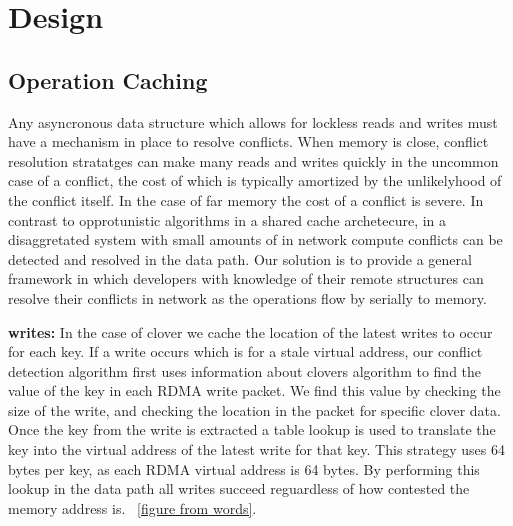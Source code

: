 \section{Design}


\subsection{Operation Caching}

Any asyncronous data structure which allows for lockless reads and writes must
have a mechanism in place to resolve conflicts. When memory is close, conflict
resolution stratatges can make many reads and writes quickly in the uncommon
case of a conflict, the cost of which is typically amortized by the unlikelyhood
of the conflict itself. In the case of far memory the cost of a conflict is
severe. In contrast to opprotunistic algorithms in a shared cache archetecure,
in a disaggretated system with small amounts of in network compute conflicts can
be detected and resolved in the data path. Our solution is to provide a general
framework in which developers with knowledge of their remote structures can
resolve their conflicts in network as the operations flow by serially to memory. 

\textbf{writes:} In the case of clover we cache the location of the latest writes to occur for
each key. If a write occurs which is for a stale virtual address, our conflict
detection algorithm first uses information about clovers algorithm to find the
value of the key in each RDMA write packet. We find this value by checking the
size of the write, and checking the location in the packet for specific clover
data. Once the key from the write is extracted a table lookup is used to
translate the key into the virtual address of the latest write for that key.
This strategy uses 64 bytes per key, as each RDMA virtual address is 64 bytes.
By performing this lookup in the data path all writes succeed reguardless of how
contested the memory address is. ~\ref{figure from words}.

